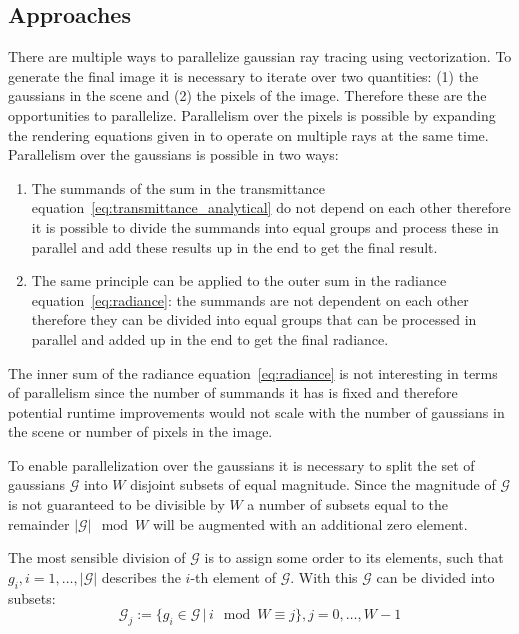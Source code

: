 \documentclass[a4paper, 11pt]{memoir}
\begin{document}
    \subsection{Approaches}
    There are multiple ways to parallelize gaussian ray tracing using vectorization. To generate the final image it is necessary to iterate
    over two quantities: (1) the gaussians in the scene and (2) the pixels of the image. Therefore these are the opportunities to parallelize.
    Parallelism over the pixels is possible by expanding the rendering equations given in \cite{Rhodin:2015} to operate on multiple rays at the
    same time. Parallelism over the gaussians is possible in two ways:
    \begin{enumerate}
        \item The summands of the sum in the \gls{transmittance} equation~\eqref{eq:transmittance_analytical} do not depend on each
            other therefore it is possible to divide the summands into equal groups and process these in parallel
            and add these results up in the end to get the final result.
        \item The same principle can be applied to the outer sum in the \gls{radiance} equation~\eqref{eq:radiance}: the summands are
            not dependent on each other therefore they can be divided into equal groups that can
            be processed in parallel and added up in the end to get the final \gls{radiance}.
    \end{enumerate}
    The inner sum of the \gls{radiance} equation~\eqref{eq:radiance} is not interesting in terms of parallelism since the number
    of summands it has is fixed and therefore potential runtime improvements would not scale with the number of gaussians in the scene or number
    of pixels in the image.

    To enable parallelization over the gaussians it is necessary to split the set of
    gaussians $\mathcal{G}$ into $W$ disjoint subsets of equal magnitude. Since the magnitude of $\mathcal{G}$ is not guaranteed to be divisible by $W$
    a number of subsets equal to the remainder $|\mathcal{G}| \mod W$ will be augmented with an additional zero element.

    The most sensible division of $\mathcal{G}$ is to assign some order to its elements, such that $g_i, i=1,\dots,|\mathcal{G}|$ describes the $i$-th element of
    $\mathcal{G}$. With this $\mathcal{G}$ can be divided into subsets:
    \begin{equation}
        \mathcal{G}_j := \{ g_i \in \mathcal{G} \,|\, i \mod W \equiv j \}, j=0,\dots,W-1
    \end{equation}
\end{document}

